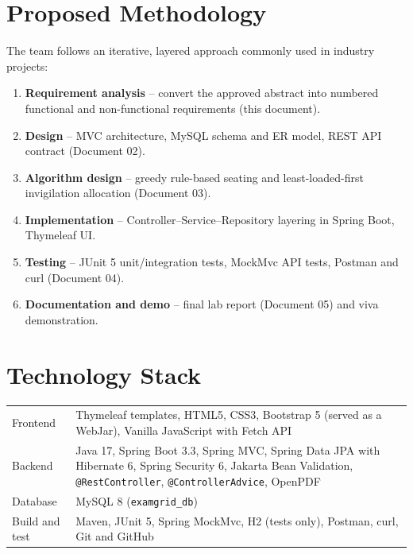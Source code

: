 \documentclass[11pt,a4paper]{article}
\begin{document}
\section{Proposed Methodology}
The team follows an iterative, layered approach commonly used in industry projects:
\begin{enumerate}
  \item \textbf{Requirement analysis} -- convert the approved abstract into numbered functional and non-functional requirements (this document).
  \item \textbf{Design} -- MVC architecture, MySQL schema and ER model, REST API contract (Document 02).
  \item \textbf{Algorithm design} -- greedy rule-based seating and least-loaded-first invigilation allocation (Document 03).
  \item \textbf{Implementation} -- Controller--Service--Repository layering in Spring Boot, Thymeleaf UI.
  \item \textbf{Testing} -- JUnit 5 unit/integration tests, MockMvc API tests, Postman and curl (Document 04).
  \item \textbf{Documentation and demo} -- final lab report (Document 05) and viva demonstration.
\end{enumerate}

\section{Technology Stack}
\begin{tabularx}{\linewidth}{|L{2.8cm}|X|}
\hline\headrow{} & \\\hline
Frontend & Thymeleaf templates, HTML5, CSS3, Bootstrap 5 (served as a WebJar), Vanilla JavaScript with Fetch API\\\hline
Backend & Java 17, Spring Boot 3.3, Spring MVC, Spring Data JPA with Hibernate 6, Spring Security 6, Jakarta Bean Validation, \texttt{@RestController}, \texttt{@ControllerAdvice}, OpenPDF\\\hline
Database & MySQL 8 (\texttt{examgrid\_db})\\\hline
Build and test & Maven, JUnit 5, Spring MockMvc, H2 (tests only), Postman, curl, Git and GitHub\\\hline
\end{tabularx}
\end{document}
